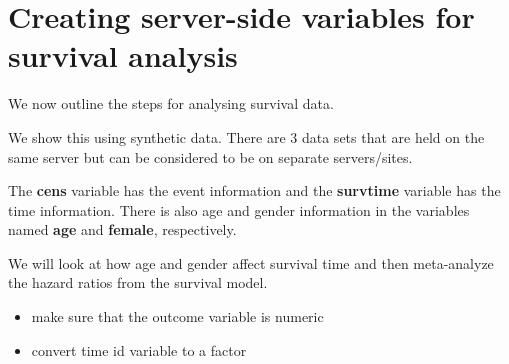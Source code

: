 \documentclass[
]{book}
\newenvironment{Shaded}{\begin{snugshade}}{\end{snugshade}}
\newcommand{\DataTypeTok}[1]{\textcolor[rgb]{0.13,0.29,0.53}{#1}}
\newcommand{\KeywordTok}[1]{\textcolor[rgb]{0.13,0.29,0.53}{\textbf{#1}}}
\newcommand{\NormalTok}[1]{#1}
\newcommand{\StringTok}[1]{\textcolor[rgb]{0.31,0.60,0.02}{#1}}
\providecommand{\tightlist}{%
  \setlength{\itemsep}{0pt}\setlength{\parskip}{0pt}}
\begin{document}
\hypertarget{creating-server-side-variables-for-survival-analysis}{%
\section{Creating server-side variables for survival analysis}\label{creating-server-side-variables-for-survival-analysis}}

We now outline the steps for analysing survival data.

We show this using synthetic data. There are 3 data sets that are held on the same server but can be considered to be on separate servers/sites.

The \textbf{cens} variable has the event information and the \textbf{survtime} variable has the time information. There is also age and gender information in the variables named \textbf{age} and \textbf{female}, respectively.

We will look at how age and gender affect survival time and then meta-analyze the hazard ratios from the survival model.

\begin{itemize}
\tightlist
\item
  make sure that the outcome variable is numeric
\end{itemize}

\begin{Shaded}
\end{Shaded}

\begin{itemize}
\tightlist
\item
  convert time id variable to a factor
\end{itemize}

\begin{Shaded}
\end{Shaded}
\end{document}
